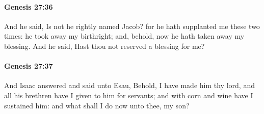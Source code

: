 		\paragraph{Genesis 27:36} %
			\label{GENESIS-27-36}

			And he said, Is not he rightly named Jacob? for he hath supplanted me these two times: he took away my birthright; and, behold, now he hath taken away my blessing. And he said, Hast thou not reserved a blessing for me?


		\paragraph{Genesis 27:37} %
			\label{GENESIS-27-37}

			And Isaac answered and said unto Esau, Behold, I have made him thy lord, and all his brethren have I given to him for servants; and with corn and wine have I sustained him: and what shall I do now unto thee, my son?

